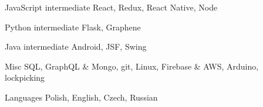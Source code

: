 
\begin{cvskills}

	\cvskill
		{JavaScript}
		{intermediate}
		{React, Redux, React Native, Node}

	\cvskill
		{Python}
		{intermediate}
		{Flask, Graphene}

	\cvskill
		{Java}
		{intermediate}
		{Android, JSF, Swing}

	\cvskill
		{Misc}
		{}
			{SQL, GraphQL \& Mongo, git, Linux, Firebase \& AWS, Arduino, lockpicking}

	\cvskill
		{Languages}
		{}
		{Polish, English, Czech, Russian}

\end{cvskills}
